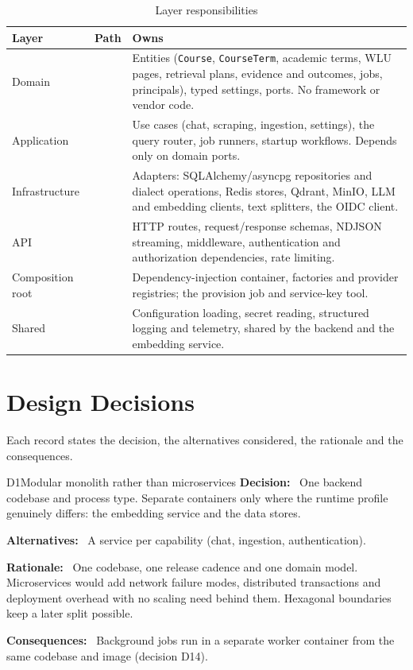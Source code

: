 \documentclass[11pt,letterpaper]{report}
\newcommand{\field}[1]{\textbf{\color{lauPurple}#1:}~}
\begin{document}
\begin{table}[H]
\centering
\caption{Layer responsibilities}\label{tab:layers}
\begin{tabularx}{\textwidth}{@{}P{2.4cm}P{4.6cm}L@{}}
\toprule
\textbf{Layer} & \textbf{Path} & \textbf{Owns} \\
\midrule
Domain &  & Entities (\texttt{Course}, \texttt{CourseTerm}, academic terms, WLU pages, retrieval plans, evidence and outcomes, jobs, principals), typed settings, ports. No framework or vendor code. \\
Application &  & Use cases (chat, scraping, ingestion, settings), the query router, job runners, startup workflows. Depends only on domain ports. \\
Infrastructure &  & Adapters: SQLAlchemy/asyncpg repositories and dialect operations, Redis stores, Qdrant, MinIO, LLM and embedding clients, text splitters, the OIDC client. \\
API &  & HTTP routes, request/response schemas, NDJSON streaming, middleware, authentication and authorization dependencies, rate limiting. \\
Composition root &  & Dependency-injection container, factories and provider registries; the provision job and service-key tool. \\
Shared &  & Configuration loading, secret reading, structured logging and telemetry, shared by the backend and the embedding service. \\
\bottomrule
\end{tabularx}
\end{table}

\chapter{Design Decisions}\label{ch:decisions}
Each record states the decision, the alternatives considered, the rationale and the consequences.

\begin{decision}{D1}{Modular monolith rather than microservices}
\field{Decision} One backend codebase and process type. Separate containers only where the runtime
profile genuinely differs: the embedding service and the data stores.\par
\field{Alternatives} A service per capability (chat, ingestion, authentication).\par
\field{Rationale} One codebase, one release cadence and one domain model. Microservices would add network
failure modes, distributed transactions and deployment overhead with no scaling need behind them.
Hexagonal boundaries keep a later split possible.\par
\field{Consequences} Background jobs run in a separate worker container from the same codebase and image (decision D14).
\end{decision}
\end{document}
